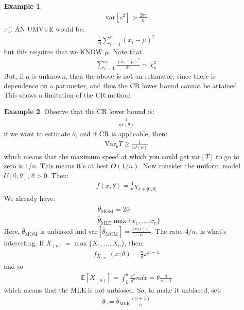 \documentclass[11pt]{scrartcl}
\theoremstyle{definition}
\newtheorem{ex}{Example}
\theoremstyle{remark}
\newcommand{\EX}[1]{\mathbb{E}\left[#1 \right]}
\newcommand{\idx}[2]{\int_{#1}^{#2}}
\begin{document}
{\begin{ex}
\begin{align*}
			\text{var}[s^2] > \frac{2\sigma^2}{n}
	\end{align*}
	:-(. AN UMVUE would be:
	\begin{align*}
			\frac{1}{n} \sum_{i=1}^n (x_i - \mu)^2 
	\end{align*}
	but this requires that we KNOW $\mu$. Note that
	\begin{align*}
	\sum_{i=1}^n \frac{(x_i- \mu)^2}{\sigma^2} \sim \chi_n^2
	\end{align*}
	But, if $\mu$ is unknown, then the above is not an estimator, since there is dependence on a parameter, and thus the CR lower bound cannot be attained. This shows a limitation of the CR method. 
\end{ex}

\begin{ex} 
	Observe that the CR lower bound is: 
	\begin{align*}
		\frac{1}{nI(\theta)}
	\end{align*}
	if we want to estimate $\theta$, and if CR is applicable, then: 
	\begin{align*}
		\text{Var}_\theta T \geq \frac{1}{nI(\theta)}
	\end{align*}	
	which means that the maximum speed at which you could get var$[T]$ to go to zero is $1/n$. This means it's at best $O(1/n)$. Now consider the uniform model $U[0, \theta]$, $\theta > 0$. Then: 
	\begin{align*}
		f(x; \theta) = \frac{1}{\theta} \chi_{x \in ]0, \theta[} 
	\end{align*}
	We already have: 
	\begin{align*}
			& \hat{\theta}_{\text{MOM}} = 2 \overline{x} \\
			& \hat{\theta}_{\text{MLE}} \max \{ x_1, ..., x_n \} 
	\end{align*}
	Here, $\hat{\theta}_{\text{MOM}}$ is unbiased and var$[\hat{\theta}_{\text{MOM}}] = \frac{4 \text{var}[x]}{n}$. The rate, $4/n$, is what's interesting. If $X_{(n)} = \max \{ X_1, ..., X_n \}$, then: 
	\begin{align*}
			f_{X_{(n)}}(x; \theta) = \frac{n}{\theta} x^{n-1} 
	\end{align*}
	and so 
	\begin{align*}
			\EX{X_{(n)}} = \idx{0}{\theta} \frac{x^n}{\theta^n} n dx = \theta \frac{n}{n+1}
	\end{align*}
	which means that the MLE is not unbiased. So, to make it unbiased, set: 
	\begin{align*}
			\widetilde{\theta} := \hat{\theta}_{\text{MLE}} \frac{(n+1)}{n}

\end{align*}
\end{ex}}
\end{document}
